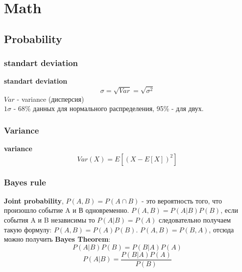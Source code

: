 \documentclass{book}
\begin{document}
\part{Math}
\chapter{Probability}
\section{standart deviation}
\textbf{standart deviation}
$$\sigma = \sqrt{Var} = \sqrt{\sigma^2}$$$Var$ - variance (дисперсия)\\
$1\sigma$ - 68\% данных для нормального распределения, 95\% - для двух.
\section{Variance}
\textbf{variance}$$Var(X) = E[(X-E[X])^2]$$


\section{Bayes rule}
\textbf{Joint probability}, $P(A, B)=P(A\cap B)$ - это вероятность того, что произошло событие A и В одновременно. $P(A, B) = P(A|B)P(B)$, если события A и B независимы то $P(A|B)=P(A)$ следовательно получаем такую формулу: $P(A, B)=P(A)P(B)$. $P(A, B)=P(B,A)$, отсюда можно получить \textbf{Bayes Theorem}: $$P(A|B)P(B)=P(B|A)P(A)$$ $$P(A|B)=\frac{P(B|A)P(A)}{P(B)}$$
\end{document}
